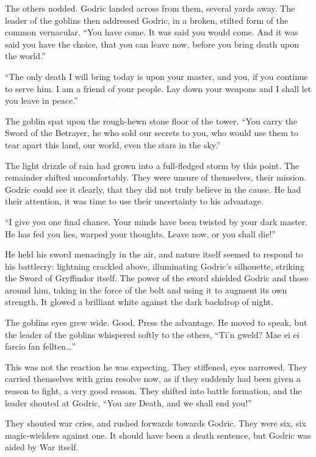The others nodded. Godric landed across from them, several yards away. The leader of the goblins then addressed Godric, in a broken, stilted form of the common vernacular. “You have come. It was said you would come. And it was said you have the choice, that you can leave now, before you bring death upon the world.”

“The only death I will bring today is upon your master, and you, if you continue to serve him. I am a friend of your people. Lay down your weapons and I shall let you leave in peace.”

The goblin spat upon the rough-hewn stone floor of the tower. “You carry the Sword of the Betrayer, he who sold our secrets to you, who would use them to tear apart this land, our world, even the stars in the sky.”

The light drizzle of rain had grown into a full-fledged storm by this point. The remainder shifted uncomfortably. They were unsure of themselves, their mission. Godric could see it clearly, that they did not truly believe in the cause. He had their attention, it was time to use their uncertainty to his advantage.

“I give you one final chance. Your minds have been twisted by your dark master. He has fed you lies, warped your thoughts. Leave now, or you shall die!”

He held his sword menacingly in the air, and nature itself seemed to respond to his battlecry: lightning crackled above, illuminating Godric’s silhouette, striking the Sword of Gryffindor itself. The power of the sword shielded Godric and those around him, taking in the force of the bolt and using it to augment its own strength. It glowed a brilliant white against the dark backdrop of night.

The goblins eyes grew wide. Good. Press the advantage. He moved to speak, but the leader of the goblins whispered softly to the others, “Ti’n gweld? Mae ei ei farcio fan fellten…”

This was not the reaction he was expecting. They stiffened, eyes narrowed. They carried themselves with grim resolve now, as if they suddenly had been given a reason to fight, a very good reason. They shifted into battle formation, and the leader shouted at Godric, “You are Death, and we shall end you!”

They shouted war cries, and rushed forwards towards Godric. They were six, six magic-wielders against one. It should have been a death sentence, but Godric was aided by War itself.


